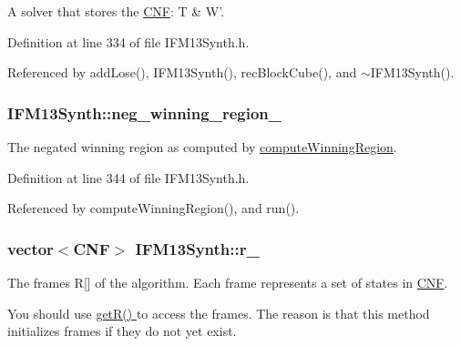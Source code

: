 A solver that stores the \hyperlink{classCNF}{C\-N\-F}\-: T \& W'. 



Definition at line 334 of file I\-F\-M13\-Synth.\-h.



Referenced by add\-Lose(), I\-F\-M13\-Synth(), rec\-Block\-Cube(), and $\sim$\-I\-F\-M13\-Synth().

\hypertarget{classIFM13Synth_a334e8e6b638c8c57da3db0c3d161231b}{
\subsubsection[{neg\-\_\-winning\-\_\-region\-\_\-}]{ I\-F\-M13\-Synth\-::neg\-\_\-winning\-\_\-region\-\_\-\hspace{0.3cm}{\ttfamily [protected]}}}\label{classIFM13Synth_a334e8e6b638c8c57da3db0c3d161231b}


The negated winning region as computed by \hyperlink{classIFM13Synth_a51c6831265e1daf7d0120c0dd954a0c4}{compute\-Winning\-Region}. 



Definition at line 344 of file I\-F\-M13\-Synth.\-h.



Referenced by compute\-Winning\-Region(), and run().

\hypertarget{classIFM13Synth_a10aead75cfca1b96cdd6c17f6825a9b7}{
\subsubsection[{r\-\_\-}]{\setlength{\rightskip}{0pt plus 5cm}vector$<${\bf C\-N\-F}$>$ I\-F\-M13\-Synth\-::r\-\_\-\hspace{0.3cm}{\ttfamily [protected]}}}\label{classIFM13Synth_a10aead75cfca1b96cdd6c17f6825a9b7}


The frames R\mbox{[}\mbox{]} of the algorithm. Each frame represents a set of states in \hyperlink{classCNF}{C\-N\-F}. 

You should use \hyperlink{classIFM13Synth_a050f0c3c5089ef6c5f793878bd60abc9}{get\-R() } to access the frames. The reason is that this method initializes frames if they do not yet exist. 

